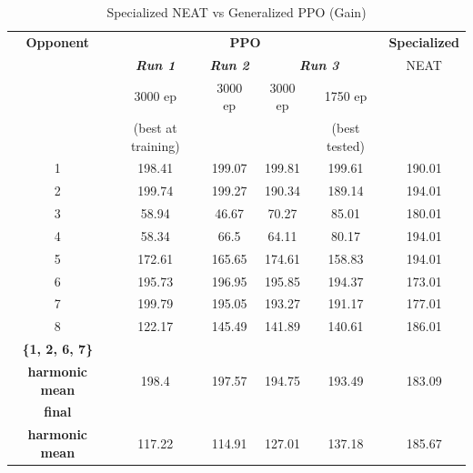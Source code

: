\documentclass[conference]{IEEEtran}
\begin{document}
    \begin{table}[htbp]
        \caption{Specialized NEAT vs Generalized PPO (Gain)}
        \begin{center}
            \begin{tabular}{|c|c|c|c|c|c|}
                \hline
                \textbf{Opponent}&\multicolumn{4}{|c|}{\textbf{PPO}}&\textbf{Specialized} \\
                \cline{2-5}
                & \textbf{\textit{Run 1}}& \textbf{\textit{Run 2}}& \multicolumn{2}{|c|}{\textbf{\textit{Run 3}}} & NEAT \\
                \cline{4-5}
                & 3000 ep & 3000 ep & 3000 ep & 1750 ep & \\
                & (best at training) & & & (best tested) & \\
                \hline
                1 & 198.41 & 199.07 & 199.81 & 199.61 & 190.01 \\
                2 & 199.74 & 199.27 & 190.34 & 189.14 & 194.01 \\
                3 & 58.94 & 46.67 & 70.27 & 85.01 & 180.01 \\
                4 & 58.34 & 66.5 & 64.11 & 80.17 & 194.01 \\
                5 & 172.61 & 165.65 & 174.61 & 158.83 & 194.01\\
                6 & 195.73 & 196.95 & 195.85 & 194.37 & 173.01 \\
                7 & 199.79 & 195.05 & 193.27 & 191.17 & 177.01 \\
                8 & 122.17 & 145.49 & 141.89 & 140.61 & 186.01 \\
                \hline
                \textbf{\{1, 2, 6, 7\}} & & & & & \\
                \textbf{harmonic mean} & 198.4 & 197.57 & 194.75 & 193.49 & 183.09 \\
                \hline
                \textbf{final} & & & & & \\
                \textbf{harmonic mean} & 117.22 & 114.91 & 127.01 & 137.18 & 185.67\\
                \hline

            \end{tabular}
            \label{tab1}
        \end{center}
    \end{table}
\end{document}
